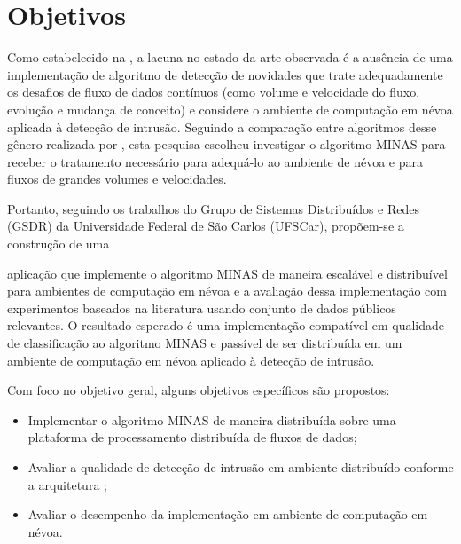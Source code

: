 
\section{Objetivos}\label{sec:objetivos}

Como estabelecido na , a lacuna no estado da arte observada é
a ausência de uma implementação de algoritmo de detecção de
novidades que trate adequadamente os desafios de fluxo de dados contínuos
(como volume e velocidade do fluxo, evolução e mudança de conceito)
e considere o ambiente de computação em névoa aplicada à detecção de
intrusão.
Seguindo a comparação entre algoritmos desse gênero realizada por
, esta pesquisa escolheu investigar o algoritmo MINAS \cite{Faria2015minas}
para receber o tratamento necessário para adequá-lo ao ambiente de névoa e para
fluxos de grandes volumes e velocidades.

Portanto, seguindo os trabalhos do Grupo de Sistemas Distribuídos e Redes
(GSDR) da Universidade Federal de São Carlos (UFSCar), propõem-se a construção
de uma 

aplicação que implemente o algoritmo MINAS
de maneira escalável e distribuível para ambientes de computação em névoa e a avaliação
dessa implementação com experimentos baseados na literatura usando conjunto de dados
públicos relevantes.
O resultado esperado é uma implementação compatível em qualidade de
classificação ao algoritmo MINAS e passível de ser distribuída em um ambiente
de computação em névoa aplicado à detecção de intrusão.

Com foco no objetivo geral, alguns objetivos específicos são propostos:

\begin{itemize}

    \item Implementar o algoritmo MINAS de maneira distribuída sobre uma
    plataforma de processamento distribuída de fluxos de dados;

    \item Avaliar a qualidade de detecção de intrusão em ambiente distribuído 
    conforme a arquitetura \arch;
    
    \item Avaliar o desempenho da implementação em ambiente de computação em névoa.

\end{itemize}

